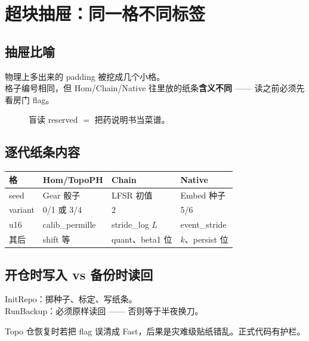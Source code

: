 \chapter{超块抽屉：同一格不同标签}
\label{ch:superblock}

\section{抽屉比喻}

\begin{metaphor}[共享收纳盒]
物理上多出来的 padding 被挖成几个小格。\\
格子编号相同，但 Hom/Chain/Native 往里放的纸条\textbf{含义不同} —— 读之前必须先看房门 flag。
\end{metaphor}

\begin{figure}[htbp]
\centering
{}
\caption{盲读 reserved $=$ 把药说明书当菜谱。}
\label{fig:drawer}
\end{figure}

\section{逐代纸条内容}

\begin{center}
\small
\begin{tabular}{@{}llll@{}}
\toprule
格 & Hom/TopoPH & Chain & Native \\
\midrule
seed & Gear 骰子 & LFSR 初值 & Embed 种子 \\
variant & 0/1 或 3/4 & 2 & 5/6 \\
u16 & calib\_permille & stride\_log $L$ & event\_stride \\
其后 & shift 等 & quant、beta1 位 & $k$、persist 位 \\
\bottomrule
\end{tabular}
\end{center}

\section{开仓时写入 vs 备份时读回}

InitRepo：掷种子、标定、写纸条。\\
RunBackup：必须原样读回 —— 否则等于半夜换刀。

\begin{pitfall}[误清 FastCDC]
Topo 仓恢复时若把 flag 误清成 Fast，后果是灾难级贴纸错乱。正式代码有护栏。
\end{pitfall}
